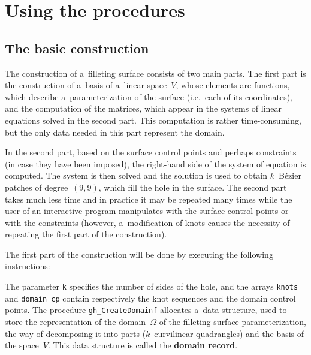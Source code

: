 


\newpage
\section{Using the procedures}

\subsection{The basic construction}

The construction of a~filleting surface consists of two main parts.
The first part is the construction of a~basis of a~linear space~$V$, whose
elements are functions, which describe a~parameterization of the surface
(i.e.\ each of its coordinates), and the computation of the matrices,
which appear in the systems of linear equations solved in the second
part. This computation is rather time-consuming, but the only data
needed in this part represent the domain.

In the second part, based on the surface control points and perhaps constraints
(in case they have been imposed), the right-hand side of the system of equation
is computed. The system is then solved and the solution is used to obtain
$k$~B\'{e}zier patches of degree~$(9,9)$, which fill the hole in the surface.
The second part takes much less time and in practice it may be repeated
many times while the user of an interactive program manipulates with
the surface control points or with the constraints (however, a~modification
of knots causes the necessity of repeating the first part of the construction).

The first part of the construction will be done by executing the following
instructions:

\vspace{\medskipamount}

\vspace{\medskipamount}
\begin{sloppypar}
The parameter \texttt{k} specifies the number of sides of the hole, and the
arrays \texttt{knots} and \texttt{domain\_cp} contain respectively the knot
sequences and the domain control points. The procedure \texttt{gh\_CreateDomainf}
allocates a~data structure, used to store the representation of the
domain~$\varOmega$ of the filleting surface parameterization,  the way
of decomposing it into parts ($k$~curvilinear quadrangles) and the
basis of the space~$V$. This data structure is called the \textbf{domain record}.%
\end{sloppypar}

